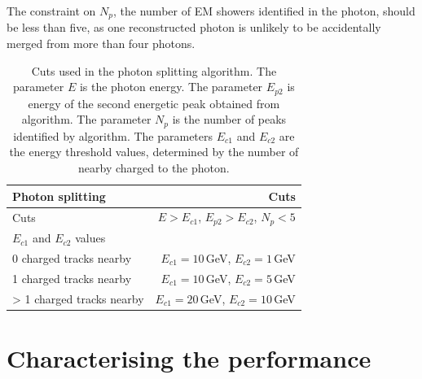 
The constraint on $N_{p}$, the number of EM showers identified in the photon, should be less than five, as one reconstructed photon is unlikely to be accidentally merged from more than four photons.


\begin{table}[htbp]
\centering
\smallskip
\begin{tabular}{l r }
\hline
\hline
Photon splitting&  Cuts\\
\hline
\multicolumn{1}{L{0.3\textwidth}}{Cuts} & \multicolumn{1}{R{0.6\textwidth}}{$E > E_{c1}$, $E_{p2} > E_{c2}$, $N_{p} < 5$} \\
\hline
$E_{c1}$ and $E_{c2}$ values &  \\
\hline
\multicolumn{1}{L{0.3\textwidth}}{0 charged tracks nearby} & \multicolumn{1}{R{0.6\textwidth}}{$E_{c1} = 10$\,GeV, $E_{c2} = 1$\,GeV} \\
\multicolumn{1}{L{0.3\textwidth}}{1 charged tracks nearby} & \multicolumn{1}{R{0.6\textwidth}}{$E_{c1} = 10$\,GeV, $E_{c2} = 5$\,GeV} \\
\multicolumn{1}{L{0.3\textwidth}}{> 1 charged tracks nearby} & \multicolumn{1}{R{0.6\textwidth}}{$E_{c1} = 20$\,GeV, $E_{c2} = 10$\,GeV} \\
\hline
\hline
\end{tabular}

\caption[Cuts for splitting photons.]%
{Cuts used in the photon splitting algorithm. The parameter $E$ is the photon energy. The parameter $E_{p2}$ is  energy of the second energetic peak obtained from \peakFinding algorithm. The parameter $N_{p}$ is the number of peaks identified by \peakFinding algorithm. The parameters $E_{c1}$ and $E_{c2}$ are the energy threshold values, determined by the number of nearby charged  to the photon.}
\label{tab:photonPhotonSplitting}
\end{table}

\section{Characterising the performance}




